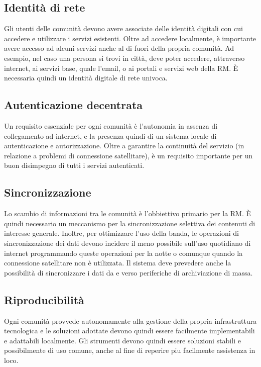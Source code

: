 \subsection{Identità di rete}
Gli utenti delle comunità devono avere associate delle identità
digitali con cui accedere e utilizzare i servizi esistenti. Oltre ad
accedere localmente, è importante avere accesso ad alcuni servizi
anche al di fuori della propria comunità. Ad esempio, nel caso una
persona si trovi in città, deve poter accedere, attraverso internet,
ai servizi base, quale l'email, o ai portali e servizi web della
RM. È necessaria quindi un identità digitale di rete univoca.

\subsection{Autenticazione decentrata}
\label{sec:AutDec}
Un requisito essenziale per ogni comunità è l'autonomia in assenza di
collegamento ad internet, e la presenza quindi di un sistema locale di
autenticazione e autorizzazione. Oltre a garantire la continuità del
servizio (in relazione a problemi di connessione satellitare), è un
requisito importante per un buon disimpegno di tutti i servizi
autenticati.

\subsection{Sincronizzazione}
Lo scambio di informazioni tra le comunità è l'obbiettivo primario per
la RM. È quindi necessario un meccanismo per la sincronizzazione
selettiva dei contenuti di interesse generale. Inoltre, per
ottimizzare l'uso della banda, le operazioni di sincronizzazione dei
dati devono incidere il meno possibile sull'uso quotidiano di internet
programmando queste operazioni per la notte o comunque quando la
connessione satellitare non è utilizzata. Il sistema deve prevedere
anche la possibilità di sincronizzare i dati da e verso periferiche di
archiviazione di massa.

\subsection{Riproducibilità}
Ogni comunità provvede autonomamente alla gestione della propria infrastruttura
tecnologica e le soluzioni adottate devono quindi essere facilmente
implementabili e adattabili localmente. Gli strumenti devono quindi essere
soluzioni stabili e possibilmente di uso comune, anche al fine di
reperire piu facilmente assistenza in loco. 

